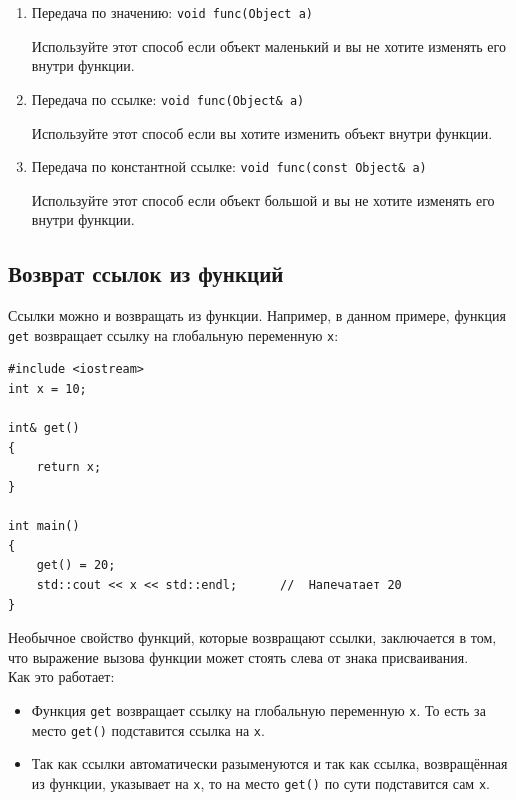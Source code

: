 \documentclass{article}
\begin{document}
\begin{enumerate}
\item Передача по значению: \quad \texttt{void func(Object a)}

Используйте этот способ если объект маленький и вы не хотите изменять его внутри функции.

\item Передача по ссылке: \quad \texttt{void func(Object\& a)}

Используйте этот способ если вы хотите изменить объект внутри функции.

\item Передача по константной ссылке: \quad \texttt{void func(const Object\& a)}

Используйте этот способ если объект большой и вы не хотите изменять его внутри функции.
\end{enumerate}



\subsection*{Возврат ссылок из функций}
Ссылки можно и возвращать из функции. Например, в данном примере, функция \texttt{get} возвращает ссылку на глобальную переменную \texttt{x}:
\begin{lstlisting}
#include <iostream>
int x = 10;

int& get() 
{
    return x;
}

int main() 
{
    get() = 20;
    std::cout << x << std::endl;      //  Напечатает 20
}
\end{lstlisting}
Необычное свойство функций, которые возвращают ссылки, заключается в том, что выражение вызова функции может стоять слева от знака присваивания.\\

Как это работает:
\begin{itemize}
\item Функция \texttt{get} возвращает ссылку на глобальную переменную \texttt{x}. То есть за место \texttt{get()} подставится ссылка на \texttt{x}.

\item Так как ссылки автоматически разыменуются и так как ссылка, возвращённая из функции, указывает на \texttt{x}, то на место \texttt{get()} по сути подставится сам \texttt{x}. 
\end{itemize}
\end{document}
